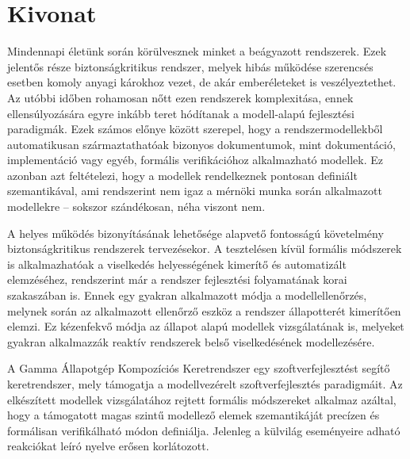 \setcounter{page}{1}

\selecthungarian

\chapter*{Kivonat}

Mindennapi életünk során körülvesznek minket a beágyazott rendszerek. Ezek jelentős része biztonságkritikus rendszer, melyek hibás működése szerencsés esetben komoly anyagi károkhoz vezet, de akár emberéleteket is veszélyeztethet. Az utóbbi időben rohamosan nőtt ezen rendszerek komplexitása, ennek ellensúlyozására egyre inkább teret hódítanak a modell-alapú fejlesztési paradigmák. Ezek számos előnye között szerepel, hogy a rendszermodellekből automatikusan származtathatóak bizonyos dokumentumok, mint dokumentáció, implementáció vagy egyéb, formális verifikációhoz alkalmazható modellek. Ez azonban azt feltételezi, hogy a modellek rendelkeznek pontosan definiált szemantikával, ami rendszerint nem igaz a mérnöki munka során alkalmazott modellekre -- sokszor szándékosan, néha viszont nem.

A helyes működés bizonyításának lehetősége alapvető fontosságú követelmény biztonságkritikus rendszerek tervezésekor. A tesztelésen kívül formális módszerek is alkalmazhatóak a viselkedés helyességének kimerítő és automatizált elemzéséhez, rendszerint már a rendszer fejlesztési folyamatának korai szakaszában is. Ennek egy gyakran alkalmazott módja a modellellenőrzés, melynek során az alkalmazott ellenőrző eszköz a rendszer állapotterét kimerítően elemzi. Ez kézenfekvő módja az állapot alapú modellek vizsgálatának is, melyeket gyakran alkalmazzák reaktív rendszerek belső viselkedésének modellezésére.

A Gamma Állapotgép Kompozíciós Keretrendszer egy szoftverfejlesztést segítő keretrendszer, mely támogatja a modellvezérelt szoftverfejlesztés paradigmáit. Az elkészített modellek vizsgálatához rejtett formális módszereket alkalmaz azáltal, hogy a támogatott magas szintű modellező elemek szemantikáját precízen és formálisan verifikálható módon definiálja. Jelenleg a külvilág eseményeire adható reakciókat leíró nyelve erősen korlátozott. 

